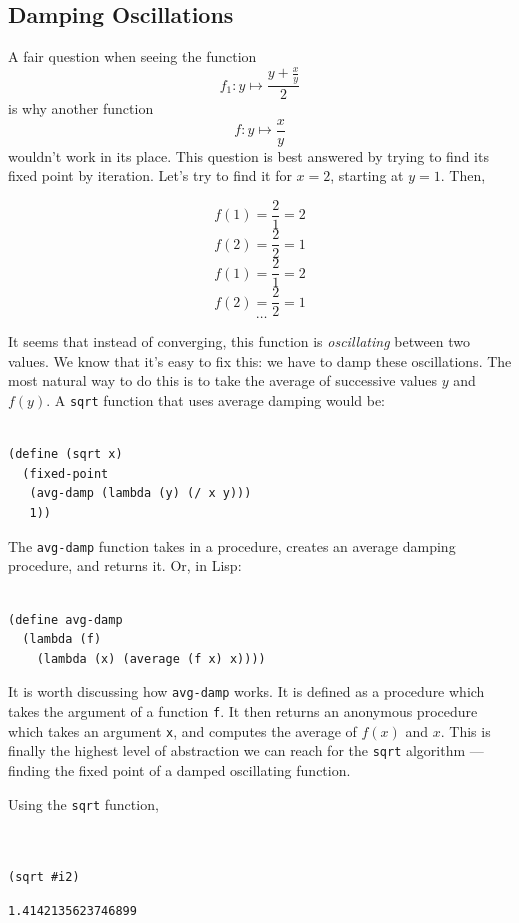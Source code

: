 \documentclass[9pt]{report}
\begin{document}
\subsection{Damping Oscillations}
\label{sec:orge6f244f}

A fair question when seeing the function
$$f_1\colon y\mapsto \frac{y+\frac{x}{y}}{2}$$
is why another function
$$f\colon y\mapsto \frac{x}{y}$$
wouldn't work in its place. This question is best
answered by trying to find its fixed point by iteration. Let's try
to find it for \(x=2\), starting at \(y=1\). Then,

$$f(1) = \frac{2}{1} = 2$$
$$f(2) = \frac{2}{2} = 1$$
$$f(1) = \frac{2}{1} = 2$$
$$f(2) = \frac{2}{2} = 1$$
$$~\dots$$

It seems that instead of converging, this function is
\emph{oscillating} between two values. We know that it's easy to fix
this: we have to damp these oscillations. The most natural way to
do this is to take the average of successive values \(y\) and
\(f(y)\). A \texttt{sqrt} function that uses average damping would be:

\begin{verbatim}

(define (sqrt x)
  (fixed-point
   (avg-damp (lambda (y) (/ x y)))
   1))
\end{verbatim}

The \texttt{avg-damp} function takes in a procedure, creates an average damping
procedure, and returns it. Or, in Lisp:

\begin{verbatim}

(define avg-damp
  (lambda (f)
    (lambda (x) (average (f x) x))))
\end{verbatim}

It is worth discussing how \texttt{avg-damp} works. It is defined as a
procedure which takes the argument of a function \texttt{f}. It then
returns an anonymous procedure which takes an argument \texttt{x}, and
computes the average of \(f(x)\) and \(x\). This is finally the
highest level of abstraction we can reach for the \texttt{sqrt}
algorithm --- finding the fixed point of a damped oscillating
function.

Using the \texttt{sqrt} function,

\begin{verbatim}


(sqrt #i2)
\end{verbatim}

\begin{verbatim}
1.4142135623746899
\end{verbatim}
\end{document}
